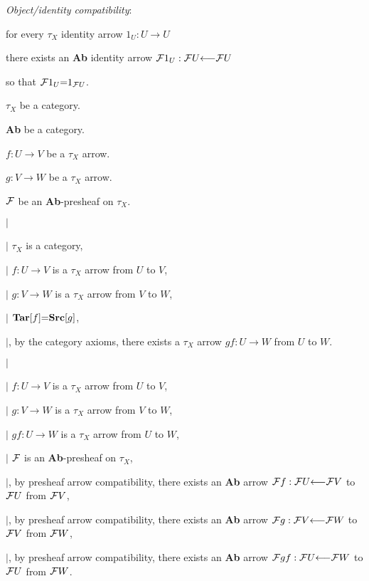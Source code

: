  {\it Object/identity compatibility}: \par
\hs\hs for every $\tau_X$ identity arrow $1_U:U \to U$ \par
\hs\hs\hs there exists an {\bf Ab} identity arrow ${\cal F}1_U: {\cal F}U \from {\cal F}U$ \par
\hs\hs\hs\hs so that ${\cal F}1_U \p= 1_{{\cal F}U}$. \par

\example \par
{} $\tau_X$ be a category. \par
{} {\bf Ab} be a category. \par
{} $f: U \to V$ be a $\tau_X$ arrow. \par
{} $g: V \to W$ be a $\tau_X$ arrow. \par
{} ${\cal F}$ be an {\bf Ab}-presheaf on $\tau_X$. \par

$|$\hs \par
$|$\hs {} $\tau_X$ is a category, \par
$|$\hs {}   $f: U \to V$ is a $\tau_X$ arrow from $U$ to $V$, \par
$|$\hs {}   $g: V \to W$ is a $\tau_X$ arrow from $V$ to $W$, \par
$|$\hs {}   ${\bf Tar}[f] \p= {\bf Src}[g]$, \par
$|$\hs {}, by the category axioms, there exists a $\tau_X$ arrow $gf: U \to W$ from $U$ to $W$. \par

$|$\hs \par
$|$\hs {} $f:  U \to V$ is a $\tau_X$ arrow from $U$ to $V$, \par
$|$\hs {}   $g:  V \to W$ is a $\tau_X$ arrow from $V$ to $W$, \par
$|$\hs {}   $gf: U \to W$ is a $\tau_X$ arrow from $U$ to $W$, \par
$|$\hs {}   ${\cal F}$ is an {\bf Ab}-presheaf on $\tau_X$, \par
$|$\hs {}, by presheaf arrow compatibility, there exists an {\bf Ab} arrow ${\cal F}f:  {\cal F}U \from {\cal F}V$ to ${\cal F}U$ from ${\cal F}V$, \par
$|$\hs {},  by presheaf arrow compatibility, there exists an {\bf Ab} arrow ${\cal F}g:  {\cal F}V \from {\cal F}W$ to ${\cal F}V$ from ${\cal F}W$, \par
$|$\hs {},  by presheaf arrow compatibility, there exists an {\bf Ab} arrow ${\cal F}gf: {\cal F}U \from {\cal F}W$ to ${\cal F}U$ from ${\cal F}W$. \par

